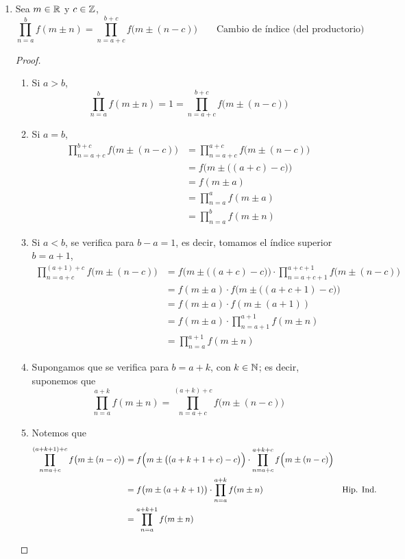 \begin{enumerate}[label=\alph*)]
    \item Sea $m\in \mathbb{R}$ y $c\in \mathbb{Z}$, \[\prod_{n=a}^{b} f(m\pm n) = \prod_{n=a+c}^{b+c} f\big(m\pm (n-c)\big) \qquad \text{Cambio de índice (del productorio)}\]
    \begin{proof}\leavevmode
      \begin{enumerate}[label=\Roman*)]
        \item Si $a>b$, \[\prod_{n=a}^{b} f(m\pm n) = 1 = \prod_{n=a+c}^{b+c} f\big(m\pm (n-c)\big)\]
        \item Si $a=b$, 
        \begin{align*}
          \prod_{n=a+c}^{b+c} f\big(m\pm (n-c)\big) &= \prod_{n=a+c}^{a+c} f\big(m\pm (n-c)\big)\\
          &= f\Big(m\pm \big((a+c)-c\big)\Big)\\
          &= f(m\pm a)\\
          &= \prod_{n=a}^{a} f(m\pm a)\\
          &= \prod_{n=a}^{b} f(m\pm n)
        \end{align*}
        \item Si $a<b$, se verifica para $b-a=1$, es decir, tomamos el índice superior $b=a+1$,
        \begin{align*}
          \prod_{n=a+c}^{(a+1)+c} f\big(m\pm (n-c)\big) &= f\Big(m\pm \big((a+c)-c\big)\Big) \cdot \prod_{n=a+c+1}^{a+c+1} f\big(m\pm (n-c)\big)\\
          &= f(m\pm a) \cdot f\Big(m\pm \big((a+c+1)-c\big)\Big)\\
          &= f(m\pm a) \cdot f(m\pm (a+1))\\
          &= f(m\pm a) \cdot \prod_{n=a+1}^{a+1} f(m \pm n)\\
          &= \prod_{n=a}^{a+1} f(m\pm n)
        \end{align*}
        \item Supongamos que se verifica para $b=a+k$, con $k\in \mathbb{N}$; es decir, suponemos que \[\prod_{n=a}^{a+k} f(m\pm n) = \prod_{n=a+c}^{(a+k)+c} f\big(m\pm (n-c)\big)\]
        \item Notemos que
        \begin{align*}
          \prod_{n=a+c}^{(a+k+1)+c} f\big(m\pm (n-c)\big) &= f\Bigl(m\pm \big((a+k+1+c)-c\big)\Bigr) \cdot \prod_{n=a+c}^{a+k+c} f\Bigl(m\pm(n-c)\Bigr)\\
          &= f\big(m \pm (a+k+1)\big) \cdot \prod_{n=a}^{a+k} f(m \pm n) & \text{Hip. Ind.}\\
          &= \prod_{n=a}^{a+k+1} f(m\pm n)
        \end{align*}
      \end{enumerate}
    \end{proof}
    

\end{enumerate}
